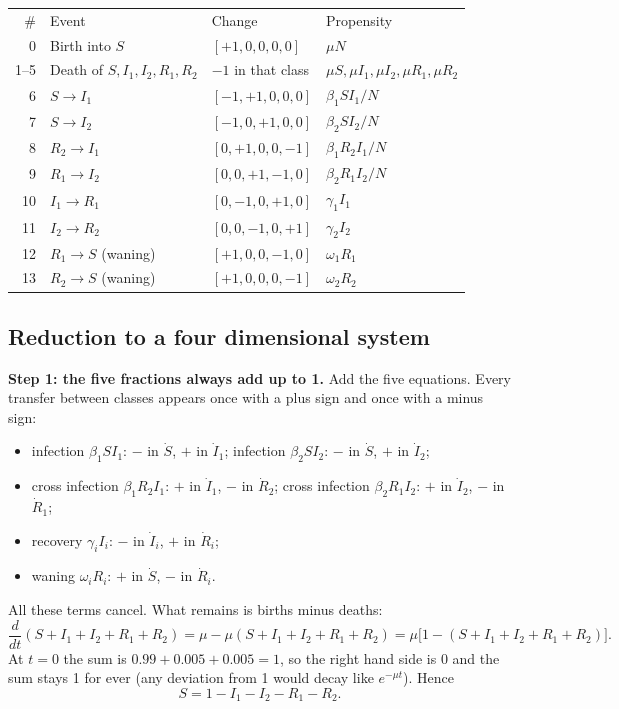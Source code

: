 \documentclass[11pt,a4paper]{article}
\begin{document}
\begin{center}
\small\renewcommand{\arraystretch}{1.18}
\begin{tabular}{r l l l}
\rowcolor{aimsred}\color{white}\# & \color{white}Event & \color{white}Change & \color{white}Propensity\\
0 & Birth into $S$ & $[+1,0,0,0,0]$ & $\mu N$\\
\rowcolor{rowpink}1--5 & Death of $S,I_1,I_2,R_1,R_2$ & $-1$ in that class & $\mu S,\mu I_1,\mu I_2,\mu R_1,\mu R_2$\\
6 & $S\to I_1$ & $[-1,+1,0,0,0]$ & $\beta_1SI_1/N$\\
\rowcolor{rowpink}7 & $S\to I_2$ & $[-1,0,+1,0,0]$ & $\beta_2SI_2/N$\\
8 & $R_2\to I_1$ & $[0,+1,0,0,-1]$ & $\beta_1R_2I_1/N$\\
\rowcolor{rowpink}9 & $R_1\to I_2$ & $[0,0,+1,-1,0]$ & $\beta_2R_1I_2/N$\\
10 & $I_1\to R_1$ & $[0,-1,0,+1,0]$ & $\gamma_1I_1$\\
\rowcolor{rowpink}11 & $I_2\to R_2$ & $[0,0,-1,0,+1]$ & $\gamma_2I_2$\\
12 & $R_1\to S$ (waning) & $[+1,0,0,-1,0]$ & $\omega_1R_1$\\
\rowcolor{rowpink}13 & $R_2\to S$ (waning) & $[+1,0,0,0,-1]$ & $\omega_2R_2$
\end{tabular}
\end{center}

\subsection{Reduction to a four dimensional system}\label{sec:reduction}

\textbf{Step 1: the five fractions always add up to 1.} Add the five equations. Every transfer between classes appears once with a plus sign and once with a minus sign:
\begin{itemize}
  \item infection $\beta_1SI_1$: $-$ in $\dot S$, $+$ in $\dot I_1$; infection $\beta_2SI_2$: $-$ in $\dot S$, $+$ in $\dot I_2$;
  \item cross infection $\beta_1R_2I_1$: $+$ in $\dot I_1$, $-$ in $\dot R_2$; cross infection $\beta_2R_1I_2$: $+$ in $\dot I_2$, $-$ in $\dot R_1$;
  \item recovery $\gamma_iI_i$: $-$ in $\dot I_i$, $+$ in $\dot R_i$;
  \item waning $\omega_iR_i$: $+$ in $\dot S$, $-$ in $\dot R_i$.
\end{itemize}
All these terms cancel. What remains is births minus deaths:
\[
\frac{d}{dt}(S+I_1+I_2+R_1+R_2)=\mu-\mu(S+I_1+I_2+R_1+R_2)=\mu\big[1-(S+I_1+I_2+R_1+R_2)\big].
\]
At $t=0$ the sum is $0.99+0.005+0.005=1$, so the right hand side is $0$ and the sum stays 1 for ever (any deviation from 1 would decay like $e^{-\mu t}$). Hence
\[
\boxed{S=1-I_1-I_2-R_1-R_2.}
\]
\end{document}
